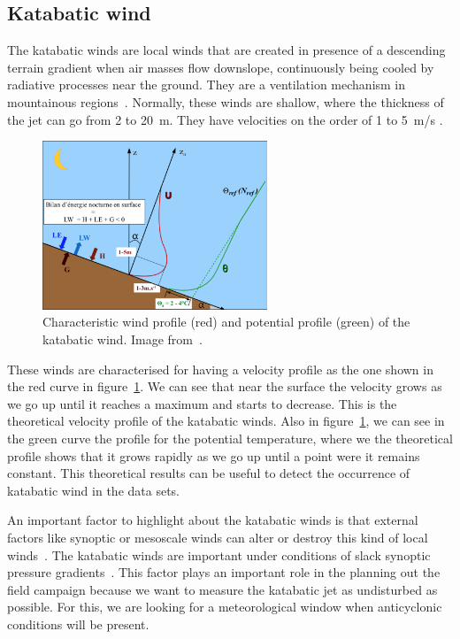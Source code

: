 \subsection{Katabatic wind}

The katabatic winds are local winds that are created in presence of a descending terrain gradient when air masses flow downslope, continuously being cooled by radiative processes near the ground. They are a ventilation mechanism in mountainous regions~\citep{manins1979model}. Normally, these winds are shallow, where the thickness of the jet can go from 2 to 20~m. They have velocities on the order of 1 to 5~m/s \citep{stull2012introduction}. 

\begin{figure}[ht!]
	\vspace{-5pt}
    \centering
\includegraphics[width=0.6\textwidth]{fig/profiles_katabatic_wind.png}
    \caption{Characteristic wind profile (red) and potential profile (green) of the katabatic wind. Image from~\cite{claudine}.}
    \label{fig:u_profile}
  \vspace{-5pt}
\end{figure}

These winds are characterised for having a velocity profile as the one shown in the red curve in figure~\ref{fig:u_profile}. We can see that near the surface the velocity grows as we go up until it reaches a maximum and starts to decrease. This is the theoretical velocity profile of the katabatic winds. Also in figure~\ref{fig:u_profile}, we can see in the green curve the profile for the potential temperature, where we the theoretical profile shows that it grows rapidly as we go up until a point were it remains constant. This theoretical results can be useful to detect the occurrence of katabatic wind in the data sets.

An important factor to highlight about the katabatic winds is that external factors like synoptic or mesoscale winds can alter or destroy this kind of local winds~\citep{stull2012introduction}. The katabatic winds are important under conditions of slack synoptic pressure gradients~\citep{manins1979katabatic}. This factor plays an important role in the planning out the field campaign because we want to measure the katabatic jet as undisturbed as possible. For this, we are looking for a meteorological window when anticyclonic conditions will be present. 

